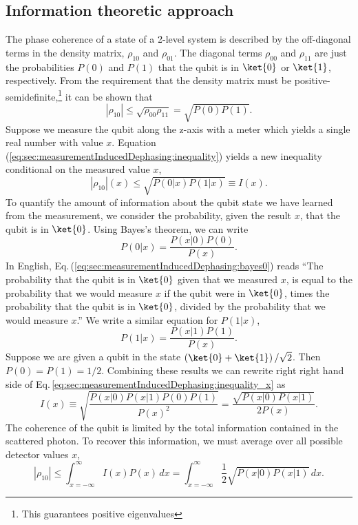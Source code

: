 \subsection{Information theoretic approach}

The phase coherence of a state of a 2-level system is described by the off-diagonal terms in the density matrix, $\rho_{10}$ and $\rho_{01}$.
The diagonal terms $\rho_{00}$ and $\rho_{11}$ are just the probabilities $P(0)$ and $P(1)$ that the qubit is in $\ket{0}$ or $\ket{1}$, respectively.
From the requirement that the density matrix must be positive-semidefinite,\footnote{This guarantees positive eigenvalues} it can be shown that \begin{equation}
\left| \rho_{10} \right| \leq \sqrt{\rho_{00} \rho_{11}} = \sqrt{P(0)P(1)} . \label{eq:sec:measurementInducedDephasing:inequality} \end{equation}
Suppose we measure the qubit along the z-axis with a meter which yields a single real number with value $x$.
Equation (\ref{eq:sec:measurementInducedDephasing:inequality}) yields a new inequality conditional on the measured value $x$, \begin{equation}
\left| \rho_{10} \right|(x) \leq \sqrt{P(0|x) P(1|x)} \equiv I(x) . \label{eq:sec:measurementInducedDephasing:inequality_x} \end{equation}
To quantify the amount of information about the qubit state we have learned from the measurement, we consider the probability, given the result $x$, that the qubit is in $\ket{0}$.
Using Bayes's theorem, we can write \begin{equation}
P(0|x) = \frac{P(x|0)P(0)}{P(x)}. \label{eq:sec:measurementInducedDephasing:bayes0} \end{equation}
In English, Eq.\,(\ref{eq:sec:measurementInducedDephasing:bayes0}) reads ``The probability that the qubit is in $\ket{0}$ given that we measured $x$, is equal to the probability that we would measure $x$ if the qubit were in $\ket{0}$, times the probability that the qubit is in $\ket{0}$, divided by the probability that we would measure $x$.''
We write a similar equation for $P(1|x)$, \begin{equation}
P(1|x) = \frac{P(x|1)P(1)}{P(x)}. \label{eq:sec:measurementInducedDephasing:bayes1} \end{equation}
Suppose we are given a qubit in the state $\left( \ket{0} + \ket{1} \right) / \sqrt{2}$.
Then $P(0)=P(1)=1/2$.
Combining these results we can rewrite right right hand side of Eq.\,\ref{eq:sec:measurementInducedDephasing:inequality_x} as \begin{equation}
I(x) \equiv \sqrt{\frac{P(x|0)P(x|1)P(0)P(1)}{P(x)^2}} = \frac{\sqrt{P(x|0)P(x|1)}}{2 P(x)} . \end{equation}
The coherence of the qubit is limited by the total information contained in the scattered photon.
To recover this information, we must average over all possible detector values $x$, \begin{equation}
\left| \rho_{10} \right| \leq \int_{x = -\infty}^{\infty} I(x) P(x) \, dx = \int_{x = -\infty}^{\infty} \frac{1}{2}\sqrt{P(x|0)P(x|1)}\,dx . \label{eq:sec:measurementInducedDephasing:integralForm} \end{equation}

